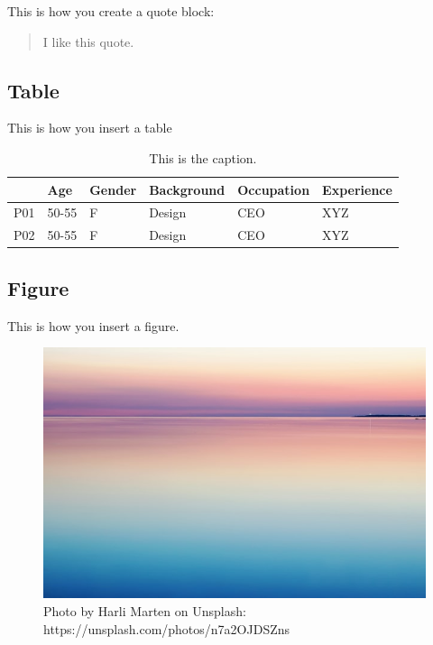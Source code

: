 This is how you create a quote block:

\begin{quote}
    I like this quote.
\end{quote}

\subsection{Table}

This is how you insert a table
\begin{table}
    \caption{This is the caption.}
    \label{tab:participant_table}
    \begin{tabular}{|p{0.7cm}|p{1.2cm}|p{1.5cm}|p{3.3cm}|p{4.3cm}|p{1.9cm}|}
      \toprule
       & Age & Gender & Background & Occupation & Experience\\
      \midrule
      P01 & 50-55 & F & Design & CEO & XYZ\\
      P02 & 50-55 & F & Design & CEO & XYZ\\
      \bottomrule
    \end{tabular}
  \end{table}


\subsection{Figure}

This is how you insert a figure.
\begin{figure}[h]
    \centering
    \includegraphics[width= \linewidth]{sources/introduction/images/harli-marten-n7a2OJDSZns-unsplash.jpg}
    \caption{Photo by Harli Marten on Unsplash: https://unsplash.com/photos/n7a2OJDSZns}
    \label{fig:my_figure_label}
  \end{figure}

